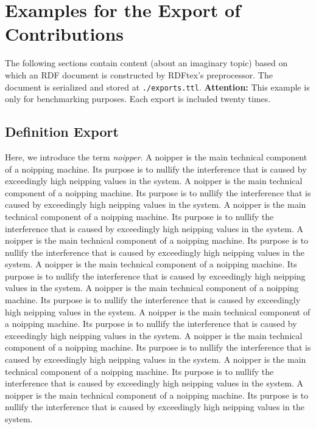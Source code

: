 
\section{Examples for the Export of Contributions}

The following sections contain content (about an imaginary topic) based on which an RDF document is constructed by RDFtex's preprocessor. The document is serialized and stored at \texttt{./exports.ttl}. \textbf{Attention:} This example is only for benchmarking purposes. Each export is included twenty times. 

\subsection{Definition Export}

Here, we introduce the term \emph{noipper}.
A noipper is the main technical component of a noipping machine. Its purpose is to nullify the interference that is caused by exceedingly high neipping values in the system.
A noipper is the main technical component of a noipping machine. Its purpose is to nullify the interference that is caused by exceedingly high neipping values in the system.
A noipper is the main technical component of a noipping machine. Its purpose is to nullify the interference that is caused by exceedingly high neipping values in the system.
A noipper is the main technical component of a noipping machine. Its purpose is to nullify the interference that is caused by exceedingly high neipping values in the system.
A noipper is the main technical component of a noipping machine. Its purpose is to nullify the interference that is caused by exceedingly high neipping values in the system.
A noipper is the main technical component of a noipping machine. Its purpose is to nullify the interference that is caused by exceedingly high neipping values in the system.
A noipper is the main technical component of a noipping machine. Its purpose is to nullify the interference that is caused by exceedingly high neipping values in the system.
A noipper is the main technical component of a noipping machine. Its purpose is to nullify the interference that is caused by exceedingly high neipping values in the system.
A noipper is the main technical component of a noipping machine. Its purpose is to nullify the interference that is caused by exceedingly high neipping values in the system.
A noipper is the main technical component of a noipping machine. Its purpose is to nullify the interference that is caused by exceedingly high neipping values in the system.
